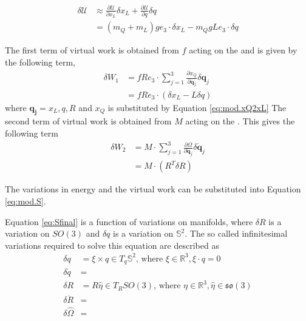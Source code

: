 \begin{equation}\label{key}
\begin{aligned}
\delta\mathcal{U}&\approx \frac{\partial \mathcal{U}}{\partial{x}_L} \delta{x}_L +\frac{\partial \mathcal{U}}{\partial{q}}\delta{q}\\
&=(m_Q+m_L)ge_3\cdot\delta x_L-m_QgLe_3\cdot\delta q
\end{aligned}
\end{equation}

The first term of virtual work is obtained from $ f $ acting on the  and is given by the following term,
\begin{equation}\label{key}
\begin{aligned}
\delta W_1&=fRe_3\cdot \sum_{j=1}^{3}\frac{\partial x_Q}{\partial \mathbf{q}_j}\delta \mathbf{q}_j\\
&=fRe_3\cdot(\delta x_L-L\delta q)
\end{aligned}
\end{equation}
where $ \mathbf{q_j}={x_L,q,R} $ and $ x_Q $ is substituted by Equation \ref{eq:mod.xQ2xL}
The second term of virtual work is obtained from $ M $ acting on the . This gives the following term
\begin{equation}\label{key}
\begin{aligned}
\delta W_2&=M\cdot \sum_{j=1}^{3}\frac{\partial\Omega}{\partial \mathbf{\dot{q}}_j}\delta \mathbf{\dot{q}}_j\\
&=M\cdot(R^T\delta R)

\end{aligned}\end{equation}

The variations in energy and the virtual work can be substituted into Equation \ref{eq:mod.S}.

Equation \ref{eq:Sfinal} is a function of variations on manifolds, where $ \delta R $ is a variation on $ SO(3) $ and $ \delta q $ is a variation on $ \mathbb{S}^2 $. 
The so called infinitesimal variations required to solve this equation are described as \cite{Bullo2005,Sreenath2013c}
\begin{equation}\label{key}
\begin{aligned}
\delta q&=\xi\times q \in T_q\mathbb{S}^2\text{, where }\xi\in\mathbb{R}^3,\xi\cdot q=0\\
\delta \dot{q}&=\\
\delta R&=R\hat{\eta}\in T_RSO(3)\text{, where } \eta\in\mathbb{R}^3,\hat{\eta}\in\mathfrak{so}(3)\\
\delta \dot{R}&=\\
\delta \hat{\Omega}&=\\
\end{aligned}
\end{equation}

